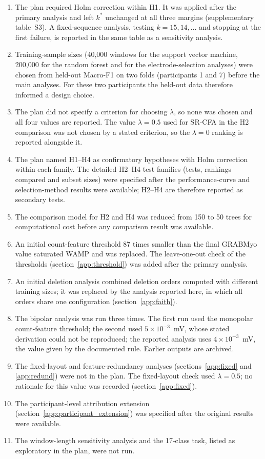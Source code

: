 \documentclass{iopjournal}
\newif\ifshowchanges
\newcommand{\chg}[1]{\ifshowchanges{\color{blue}#1}\else{#1}\fi}
\begin{document}
\begin{enumerate}
\item The plan required Holm correction within H1. It was applied after the primary analysis and left $k^*$ unchanged at all three margins (supplementary table~S3). A fixed-sequence analysis, testing $k = 15, 14, \ldots$ and stopping at the first failure, is reported in the same table as a sensitivity analysis.
\item Training-sample sizes (40,000 windows for the support vector machine, 200,000 for the random forest and for the electrode-selection analyses) were chosen from held-out Macro-F1 on two folds (participants 1 and 7) before the main analyses. For these two participants the held-out data therefore informed a design choice.
\item The plan did not specify a criterion for choosing $\lambda$, so none was chosen and all four values are reported. The value $\lambda = 0.5$ used for SR-CFA in the H2 comparison was not chosen by a stated criterion, so the $\lambda = 0$ ranking is reported alongside it.
\item \chg{The plan named H1--H4 as confirmatory hypotheses with Holm correction within each family. The detailed H2--H4 test families (tests, rankings compared and subset sizes) were specified after the performance-curve and selection-method results were available; H2--H4 are therefore reported as secondary tests.}
\item The comparison model for H2 and H4 was reduced from 150 to 50 trees for computational cost before any comparison result was available.
\item An initial count-feature threshold 87 times smaller than the final GRABMyo value saturated WAMP and was replaced. The leave-one-out check of the thresholds (section~\ref{app:threshold}) was added after the primary analysis.
\item An initial deletion analysis combined deletion orders computed with different training sizes; it was replaced by the analysis reported here, in which all orders share one configuration (section~\ref{app:faith}).
\item The bipolar analysis was run three times. The first run used the monopolar count-feature threshold; the second used $5 \times 10^{-3}$~mV, whose stated derivation could not be reproduced; the reported analysis uses $4 \times 10^{-3}$~mV, the value given by the documented rule. Earlier outputs are archived.
\item The fixed-layout and feature-redundancy analyses (sections~\ref{app:fixed} and \ref{app:redund}) were not in the plan. \chg{The fixed-layout check used $\lambda = 0.5$; no rationale for this value was recorded (section~\ref{app:fixed}).}
\item \chg{The participant-level attribution extension (section~\ref{app:participant_extension}) was specified after the original results were available.}
\item The window-length sensitivity analysis and the 17-class task, listed as exploratory in the plan, were not run.
\end{enumerate}
\end{document}
